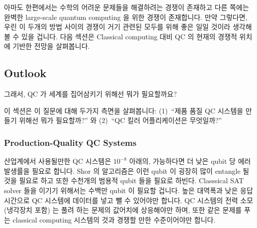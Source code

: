 아마도 한편에서는 수학의 어려운 문제들을 해결하려는 경쟁이 존재하고 다른 쪽에는
완벽한 large-scale quantum computing 을 위한 경쟁이 존재합니다.
만약 그렇다면, 우린 이 두개의 방법 사이의 경쟁이 거기 관련된 모두를 위해 좋은
일일 것이라 생각해 볼 수 있을 겁니다.
다음 섹션은 Classical computing 대비 QC 의 현재의 경쟁적 위치에 기반한 전망을
살펴봅니다.

\subsection{Outlook}
\label{sec:future:Outlook}

그래서, QC 가 세계를 집어삼키기 위해선 뭐가 필요할까요?

이 섹션은 이 질문에 대해 두가지 측면을 살펴봅니다:
(1)~``제품 품질 QC 시스템을 만들기 위해선 뭐가 필요할까?'' 와
(2)~``QC 킬러 어플리케이션은 무엇일까?''

\subsubsection{Production-Quality QC Systems}
\label{sec:future:Production-Quality QC Systems}

산업계에서 사용될만한 QC 시스템은 $10^{-8}$ 아래의, 가능하다면 더 낮은 qubit 당
에러 발생률을 필요로 합니다.
Shor 의 알고리즘은 이런 qubit 이 굉장히 많이 entangle 될 것을 필요로 하고 또한
수천개의 범용적 qubit 들을 필요로 하빈다.
Classsical SAT solver 들을 이기기 위해서는 수백만 qubit 이 필요할 겁니다.
높은 대역폭과 낮은 응답시간으로 QC 시스템에 데이터를 넣고 뺄 수 있어야만
합니다.
QC 시스템의 전력 소모 (냉각장치 포함) 는 풀려 하는 문제의 값어치에 상응해야만
하며, 또한 같은 문제를 푸는 classical computing 시스템의 것과 경쟁할 만한
수준이어야만 합니다.
\iffalse

